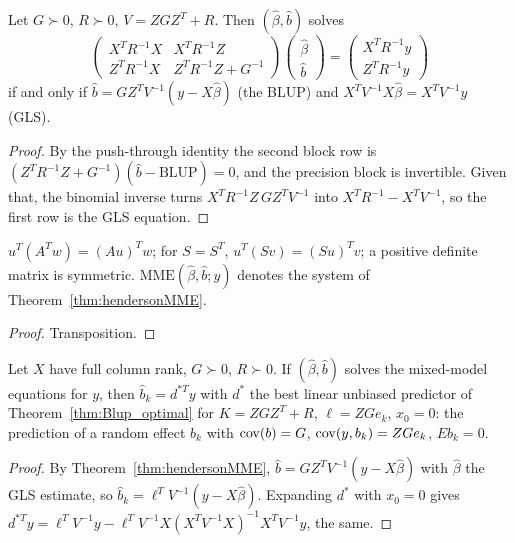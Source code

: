 \begin{theorem}\label{thm:hendersonMME}
  \leanok
  Let $G \succ 0$, $R \succ 0$, $V = ZGZ^T + R$. Then $(\hat\beta, \hat b)$ solves
  \[
    \begin{pmatrix} X^TR^{-1}X & X^TR^{-1}Z \\ Z^TR^{-1}X & Z^TR^{-1}Z + G^{-1}\end{pmatrix}
    \begin{pmatrix}\hat\beta \\ \hat b\end{pmatrix}
    = \begin{pmatrix} X^TR^{-1}y \\ Z^TR^{-1}y\end{pmatrix}
  \]
  if and only if $\hat b = GZ^TV^{-1}(y - X\hat\beta)$ (the BLUP) and
  $X^TV^{-1}X\hat\beta = X^TV^{-1}y$ (GLS).
\end{theorem}
\begin{proof}
  \leanok
  By the push-through identity the second block row is $(Z^TR^{-1}Z + G^{-1})(\hat b - \text{BLUP}) = 0$,
  and the precision block is invertible. Given that, the binomial inverse turns
  $X^TR^{-1}Z\,GZ^TV^{-1}$ into $X^TR^{-1} - X^TV^{-1}$, so the first row is the GLS equation.
\end{proof}

\begin{lemma}\label{lem:mme_dot}
  \leanok
  $u^T(A^Tw) = (Au)^Tw$; for $S = S^T$, $u^T(Sv) = (Su)^Tv$; a positive definite matrix is
  symmetric. $\mathrm{MME}(\hat\beta, \hat b; y)$ denotes the system of
  Theorem~\ref{thm:hendersonMME}.
\end{lemma}
\begin{proof}
  \leanok
  Transposition.
\end{proof}

\begin{theorem}\label{thm:hendersonMME_eq_blup}
  \leanok
  Let $X$ have full column rank, $G \succ 0$, $R \succ 0$. If $(\hat\beta, \hat b)$ solves the
  mixed-model equations for $y$, then $\hat b_k = d^{*T}y$ with $d^*$ the best linear unbiased
  predictor of Theorem~\ref{thm:Blup_optimal} for $K = ZGZ^T + R$, $\ell = ZGe_k$, $x_0 = 0$:
  the prediction of a random effect $b_k$ with $\operatorname{cov}(b) = G$, $\operatorname{cov}(y, b_k) = ZGe_k$, $E b_k = 0$.
\end{theorem}
\begin{proof}
  \leanok
  By Theorem~\ref{thm:hendersonMME}, $\hat b = GZ^TV^{-1}(y - X\hat\beta)$ with $\hat\beta$ the GLS
  estimate, so $\hat b_k = \ell^TV^{-1}(y - X\hat\beta)$. Expanding $d^*$ with $x_0 = 0$ gives
  $d^{*T}y = \ell^TV^{-1}y - \ell^TV^{-1}X(X^TV^{-1}X)^{-1}X^TV^{-1}y$, the same.
\end{proof}

